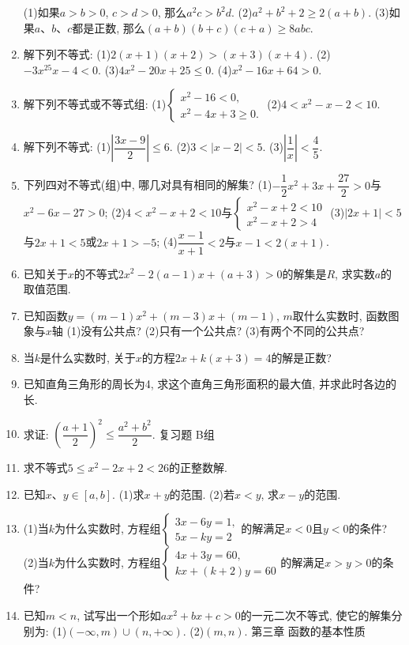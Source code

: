\documentclass[10pt,a4paper]{article}
\begin{document}
\begin{enumerate}[1.]
(1)如果$a>b>0$, $c>d>0$, 那么$a^2c>b^2d$.
(2)$a^2+b^2+2\ge 2(a+b)$.
(3)如果$a$、$b$、$c$都是正数, 那么$(a+b)(b+c)(c+a)\ge 8abc$.
\item 解下列不等式:
(1)$2(x+1)(x+2)>(x+3)(x+4)$.		(2)$-3x^25x-4<0$.
(3)$4x^2-20x+25\le 0$.					(4)$x^2-16x+64>0$.
\item 解下列不等式或不等式组:
(1)$\begin{cases} x^2-16<0, \\ x^2-4x+3\ge 0. \end{cases}$					(2)$4<x^2-x-2<10$.
\item 解下列不等式:
(1)$|\dfrac{3x-9}2|\le 6$.						(2)$3<|x-2|<5$.
(3)$|\dfrac 1x|<\dfrac 45$.
\item 下列四对不等式(组)中, 哪几对具有相同的解集?
(1)$-\dfrac 12x^2+3x+\dfrac{27}2>0$与$x^2-6x-27>0$;
(2)$4<x^2-x+2<10$与$\begin{cases} x^2-x+2<10 \\ x^2-x+2>4 \end{cases}$
(3)$|2x+1|<5$与$2x+1<5$或$2x+1>-5$;
(4)$\dfrac{x-1}{x+1}<2$与$x-1<2(x+1)$.
\item 已知关于$x$的不等式$2x^2-2(a-1)x+(a+3)>0$的解集是$R$, 求实数$a$的取值范围.
\item 已知函数$y=(m-1)x^2+(m-3)x+(m-1)$, $m$取什么实数时, 函数图象与$x$轴
(1)没有公共点?
(2)只有一个公共点?
(3)有两个不同的公共点?
\item 当$k$是什么实数时, 关于$x$的方程$2x+k(x+3)=4$的解是正数?
\item 已知直角三角形的周长为4, 求这个直角三角形面积的最大值, 并求此时各边的长.
\item 求证: $(\dfrac{a+1}2)^2\le \dfrac{a^2+b^2}2$.
复习题
B组
\item 求不等式$5\le x^2-2x+2<26$的正整数解.
\item 已知$x$、$y\in [a,b]$.
(1)求$x+y$的范围.
(2)若$x<y$, 求$x-y$的范围.
\item (1)当$k$为什么实数时, 方程组$\begin{cases} 3x-6y=1, \\ 5x-ky=2 \end{cases}$的解满足$x<0$且$y<0$的条件?
(2)当$k$为什么实数时, 方程组$\begin{cases} 4x+3y=60, \\ kx+(k+2)y=60 \end{cases}$的解满足$x>y>0$的条件?
\item 已知$m<n$, 试写出一个形如$ax^2+bx+c>0$的一元二次不等式, 使它的解集分别为:
(1)$(-\infty ,m)\cup (n,+\infty)$.					(2)$(m,n)$.
第三章  函数的基本性质

\end{enumerate}
\end{document}
